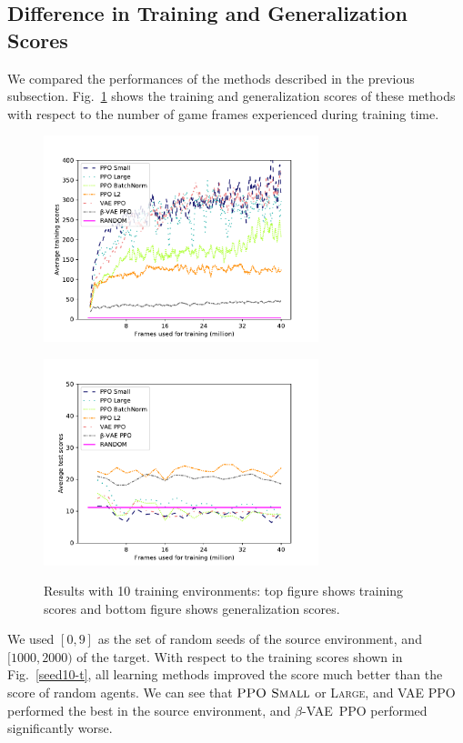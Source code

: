 \documentclass[conference]{IEEEtran}
\newcommand\ppos{$\textsc{PPO Small}$}
\newcommand\bvae{$\beta$-VAE}
\newcommand\bppo{\bvae~PPO}
\begin{document}
\subsection{Difference in Training and Generalization Scores}
We compared the performances of the methods described in the previous
subsection.
Fig.~\ref{seed10} shows the training and generalization scores of these
methods with respect to the number of game frames experienced during
training time.
\begin{figure}[t]
  \begin{minipage}[cbt]{8cm}
   \centering
   \includegraphics[width=8cm]{pictures/tscore10.pdf}
    \label{seed10-t}

   \includegraphics[width=8cm]{pictures/escore10.pdf}
    \label{seed10-e}
  \end{minipage}
 \caption{Results with 10 training environments: top figure shows
   training scores and bottom figure shows generalization scores.} \label{seed10}
\end{figure}
We used $[0, 9]$ as the set of random seeds of the source environment,
and $[1000,2000)$ of the target.
With respect to the training scores shown in Fig.~\ref{seed10-t}, all
learning methods improved the score much better than the score of random
agents.
We can see that \ppos{} or \textsc{Large}, and VAE PPO performed the
best in the source environment, and \bppo{} performed significantly
worse.
\end{document}
